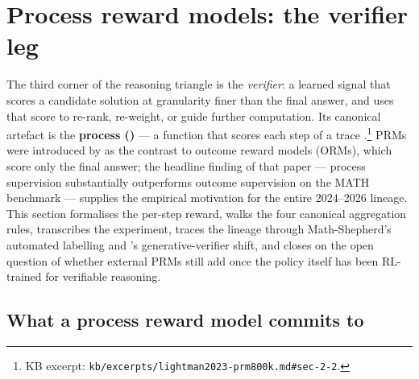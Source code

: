
\section{Process reward models: the verifier leg}
\label{sec:process-reward-models}

The third corner of the reasoning triangle is the \emph{verifier}: a
learned signal that scores a candidate solution at granularity finer
than the final answer, and uses that score to re-rank, re-weight, or
guide further computation. Its canonical artefact is the
\textbf{process  ()} — a function that scores each step
of a  trace
\citep[\S 2.2]{lightman2023-prm800k}.\footnote{KB excerpt:
\texttt{kb/excerpts/lightman2023-prm800k.md\#sec-2-2}.} PRMs were
introduced by \citet{lightman2023-prm800k} as the contrast to outcome
reward models (ORMs), which score only the final answer; the headline
finding of that paper — process supervision substantially outperforms
outcome supervision on the MATH benchmark — supplies the empirical
motivation for the entire 2024--2026  lineage. This section
formalises the per-step reward, walks the four canonical aggregation
rules, transcribes the  experiment, traces the lineage through
Math-Shepherd's automated labelling and 's generative-verifier
shift, and closes on the open question of whether external PRMs still
add  once the policy itself has been RL-trained for verifiable
reasoning.

\subsection{What a process reward model commits to}
\label{sec:prm-commitment}

